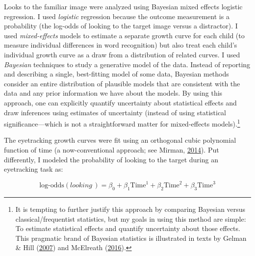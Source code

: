 \documentclass [11pt, proquest] {uwthesis}[2015/03/03]
\begin{document}
Looks to the familiar image were analyzed using Bayesian mixed effects
logistic regression. I used \emph{logistic} regression because the
outcome measurement is a probability (the log-odds of looking to the
target image versus a distractor). I used \emph{mixed-effects} models to
estimate a separate growth curve for each child (to measure individual
differences in word recognition) but also treat each child's individual
growth curve as a draw from a distribution of related curves. I used
\emph{Bayesian} techniques to study a generative model of the data.
Instead of reporting and describing a single, best-fitting model of some
data, Bayesian methods consider an entire distribution of plausible
models that are consistent with the data and any prior information we
have about the models. By using this approach, one can explicitly
quantify uncertainty about statistical effects and draw inferences using
estimates of uncertainty (instead of using statistical
significance---which is not a straightforward matter for mixed-effects
models).\footnote{It is tempting to further justify this approach by
  comparing Bayesian versus classical/frequentist statistics, but my
  goals in using this method are simple: To estimate statistical effects
  and quantify uncertainty about those effects. This pragmatic brand of
  Bayesian statistics is illustrated in texts by Gelman \& Hill
  (\protect\hyperlink{ref-GelmanHill}{2007}) and McElreath
  (\protect\hyperlink{ref-RethinkingBook}{2016}).}

The eyetracking growth curves were fit using an orthogonal cubic
polynomial function of time (a now-conventional approach; see Mirman,
\protect\hyperlink{ref-Mirman2014}{2014}). Put differently, I modeled
the probability of looking to the target during an eyetracking task as:

\[
\text{log-odds}(\textit{looking}\,) = 
  \beta_0 + 
  \beta_1\text{Time}^1 + 
  \beta_2\text{Time}^2 + 
  \beta_3\text{Time}^3
\]
\end{document}

